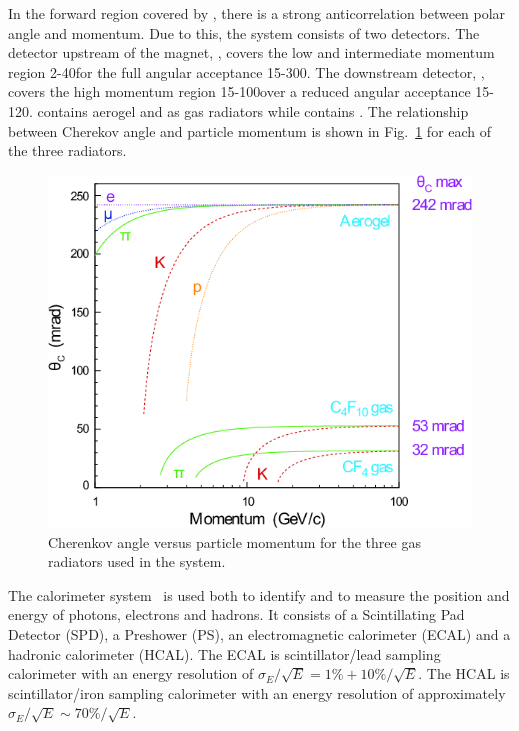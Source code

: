 In the forward region covered by \lhcb, there is a strong anticorrelation between polar angle and momentum. Due to this, the \rich system consists of two detectors. The detector upstream of the magnet, \richone, covers the low and intermediate momentum region 2-40\gevc for the full angular acceptance 15-300\mrad. The downstream detector, \richtwo, covers the high momentum region 15-100\gevc over a reduced angular acceptance 15-120\mrad. \richone contains aerogel and \cfourften as gas radiators while \richtwo contains \cffour. The relationship between Cherekov angle and particle momentum is shown in Fig.~\ref{fig:radiators} for each of the three radiators.

\begin{figure}[!htb]
\centering
\includegraphics[height=0.3\textheight]{figs/detector/radiators.png}
\caption{Cherenkov angle versus particle momentum for the three gas radiators used in the \rich system.}
\label{fig:radiators}
\end{figure}

The calorimeter system~\cite{calo-tdr} is used both to identify and to measure the position and energy of photons, electrons and hadrons. It consists of a Scintillating Pad Detector (SPD), a Preshower (PS), an electromagnetic calorimeter (ECAL) and a hadronic calorimeter (HCAL). The ECAL is scintillator/lead sampling calorimeter with an energy resolution of $\sigma_{E}/\sqrt{E} = 1\% + 10\%/\sqrt{E}$. The HCAL is scintillator/iron sampling calorimeter with an energy resolution of approximately $\sigma_{E}/\sqrt{E} \sim 70\%/\sqrt{E}$. 

